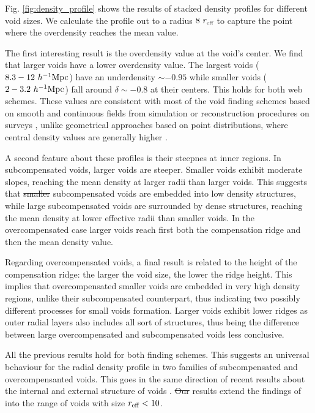 \documentclass[a4,useAMS,usenatbib,usegraphicx]{mn2e}
\newcommand{\hMpc}{{\ifmmode{h^{-1}{\rm Mpc}}\else{$h^{-1}$Mpc}\fi}}
\newcommand{\reff}{{\ifmmode{r_{\mbox{\tiny eff}}}\else{$r_{\mbox{\tiny eff}}$}\fi}}
\providecommand{\DIFaddtex}[1]{{\protect\color{blue}\uwave{#1}}} %
\providecommand{\DIFdeltex}[1]{{\protect\color{red}\sout{#1}}}                      %
\providecommand{\DIFaddbegin}{} %
\providecommand{\DIFaddend}{} %
\providecommand{\DIFdelbegin}{} %
\providecommand{\DIFdelend}{} %
\providecommand{\DIFadd}[1]{\texorpdfstring{\DIFaddtex{#1}}{#1}} %
\providecommand{\DIFdel}[1]{\texorpdfstring{\DIFdeltex{#1}}{}} %
\begin{document}
Fig. \ref{fig:density_profile} shows the results of stacked density
profiles for different void sizes.  
We calculate the profile out to a radius $8\ \reff$  to capture the
point where the overdensity reaches the mean value.


The first interesting result is the overdensity value at the void's
center.
We find that larger voids have a lower overdensity value.
The largest voids ($8.3-12\ \hMpc$) have an underdensity
\DIFdelbegin \DIFdel{$\sim-0.95$ }\DIFdelend \DIFaddbegin \DIFadd{$\delta \sim-0.95$ }\DIFaddend while smaller voids  ($2-3.2\ \hMpc$) fall around $\delta\sim 
-0.8$ at their centers.
This holds for both web schemes. 
These values are consistent with most of the void finding schemes
based on smooth and continuous fields from simulation or
reconstruction procedures on surveys \citep{Plionis02, Colberg05,
  Shandarin06,  Platen07, Neyrinck08, MunozCuartas11, Ceccarelli13,
  Paz13, Neyrinck13, Ricciardelli2013}, unlike geometrical approaches based 
on point distributions, where central density values are generally higher
\citep{Colberg08}. 


A second feature about these profiles is their steepnes at inner
regions.  
In subcompensated voids, larger voids are steeper.
Smaller voids exhibit moderate slopes, reaching the mean density at
larger radii than larger voids.
This suggests that \DIFdelbegin \DIFdel{smaller }\DIFdelend \DIFaddbegin \DIFadd{small }\DIFaddend subcompensated voids are embedded into low
density structures, while large subcompensated voids are surrounded
by dense structures, reaching the mean density at lower effective
radii than smaller voids. 
In the overcompensated case larger voids reach first  both the
compensation ridge and then the mean density value.  


Regarding overcompensated voids, a final result is related to the height 
of the compensation ridge: the larger the void size, the lower the ridge
height. This implies that overcompensated smaller voids are embedded in 
very high density regions, unlike their subcompensated counterpart, thus 
indicating two possibly different processes for small voids formation. 
Larger voids exhibit lower ridges as outer radial layers also includes all
sort of structures, thus being the difference between large overcompensated
and subcompensated voids less conclusive.

All the previous results hold for both finding schemes.
This suggests an universal behaviour for the radial density profile in
two families of subcompensated and overcompensanted voids. 
This goes in the same direction of recent results about the internal
\citep{Colberg05,  Ricciardelli2013} and external structure of voids
\citep{Lavaux12, Ceccarelli13, Paz13, Hamaus14}. 
\DIFdelbegin \DIFdel{Our }\DIFdelend \DIFaddbegin \DIFadd{Indeed, our }\DIFaddend results extend the findings of \cite{Hamaus14} into the
range of voids with size \DIFdelbegin \DIFdel{$r_{\rm eff}<10$}\DIFdelend \DIFaddbegin \DIFadd{$\reff <10$}\DIFaddend \hMpc.  
\end{document}
